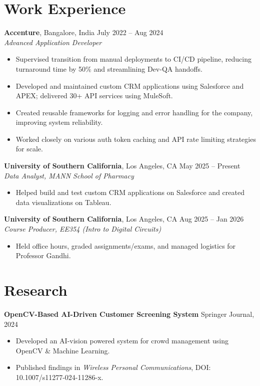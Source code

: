 \documentclass[letterpaper,10pt]{article}
\begin{document}
\section*{Work Experience}
    \textbf{Accenture}, Bangalore, India \hfill July 2022 -- Aug 2024 \\
    \textit{Advanced Application Developer}
    \begin{itemize}[leftmargin=*]
        \item Supervised transition from manual deployments to CI/CD pipeline, reducing turnaround time by 50\% and streamlining Dev-QA handoffs.
        \item Developed and maintained custom CRM applications using Salesforce and APEX; delivered 30+ API services using MuleSoft.
        \item Created reusable frameworks for logging and error handling for the company, improving system reliability.
        \item Worked closely on various auth token caching and API rate limiting strategies for scale.
    \end{itemize}

    \textbf{University of Southern California}, Los Angeles, CA \hfill May 2025 -- Present \\
    \textit{Data Analyst, MANN School of Pharmacy}
    \begin{itemize}[leftmargin=*]
        \item Helped build and test custom CRM applications on Salesforce and created data visualizations on Tableau.
    \end{itemize}

    \textbf{University of Southern California}, Los Angeles, CA \hfill Aug 2025 -- Jan 2026 \\
    \textit{Course Producer, EE354 (Intro to Digital Circuits)}
    \begin{itemize}[leftmargin=*]
        \item Held office hours, graded assignments/exams, and managed logistics for Professor Gandhi.
    \end{itemize}

\section*{Research}
    \textbf{OpenCV-Based AI-Driven Customer Screening System} \hfill Springer Journal, 2024
    \begin{itemize}[leftmargin=*]
        \item Developed an AI-vision powered system for crowd management using OpenCV \& Machine Learning.
        \item Published findings in \textit{Wireless Personal Communications}, DOI: 10.1007/s11277-024-11286-x.
    \end{itemize}
    
\end{document}
